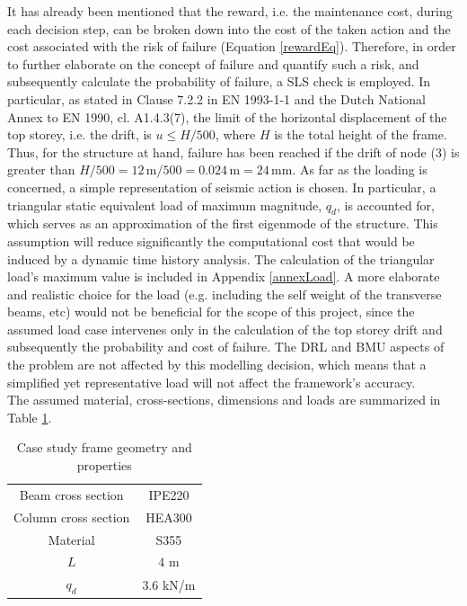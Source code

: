 It has already been mentioned that the reward, i.e. the maintenance cost, during each decision step, can be broken down into the cost of the taken action and the cost associated with the risk of failure (Equation \ref{rewardEq}). Therefore, in order to further elaborate on the concept of failure and quantify such a risk, and subsequently calculate the probability of failure, a \gls{SLS} check is employed. In particular, as stated in Clause 7.2.2 in EN 1993-1-1 \cite{EC3} and the Dutch National Annex to EN 1990, cl. A1.4.3(7), the limit of the horizontal displacement of the top storey, i.e. the drift, is $u\leq H/500$, where $H$ is the total height of the frame. Thus, for the structure at hand, failure has been reached if the drift of node (3) is greater than $H/500 = 12 \, \mathrm{m} / 500 = 0.024\, \mathrm{m} = 24\, \mathrm{mm}$. As far as the loading is concerned, a simple representation of seismic action is chosen. In particular, a triangular static equivalent load of maximum magnitude, $q_d$, is accounted for, which serves as an approximation of the first eigenmode of the structure. This assumption will reduce significantly the computational cost that would be induced by a dynamic time history analysis. The calculation of the triangular load's maximum value is included in Appendix \ref{annexLoad}. A more elaborate and realistic choice for the load (e.g. including the self weight of the transverse beams, etc) would not be beneficial for the scope of this project, since the assumed load case intervenes only in the calculation of the top storey drift and subsequently the probability and cost of failure. The \gls{DRL} and \gls{BMU} aspects of the problem are not affected by this modelling decision, which means that a simplified yet representative load will not affect the framework's accuracy.\\

The assumed material, cross-sections, dimensions and loads are summarized in Table \ref{problemDesc}.

\begin{table}[H]
    \centering
    \caption{Case study frame geometry and properties}
    \label{problemDesc}
    \begin{tabular}{cc}
        \toprule
        Beam cross section   & IPE220 \\
        Column cross section & HEA300 \\
        Material             & S355   \\ \midrule
        $L$                  & $4$ m    \\
        $q_d$                & $3.6$ kN/m    \\
        \bottomrule
    \end{tabular}
\end{table}

